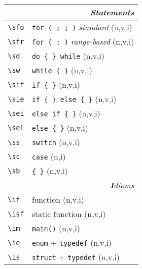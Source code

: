 \documentclass[oneside,11pt,landscape,DIV16]{scrartcl}
\begin{document}
\begin{multicols}{3}
\begin{center}
%
%
\begin{tabular}[]{|p{11mm}|p{60mm}|}
\hline
\multicolumn{2}{|r|}{\textsl{\textbf{S}tatements}} \\
\hline \verb'\sfo' & \verb'for ( ; ; )'         \hfill \textit{standard} (n,v,i)\\
\hline \verb'\sfr' & \verb'for ( : )'           \hfill \textit{range-based} (n,v,i)\\
\hline \verb'\sd'  & \verb'do { } while'        \hfill (n,v,i)\\
\hline \verb'\sw'  & \verb'while { }'           \hfill (n,v,i)\\
\hline \verb'\sif' & \verb'if { }'              \hfill (n,v,i)\\
\hline \verb'\sie' & \verb'if { } else { }'     \hfill (n,v,i)\\
\hline \verb'\sei' & \verb'else if { }'         \hfill (n,v,i)\\
\hline \verb'\sel' & \verb'else { }'            \hfill (n,v,i)\\
\hline \verb'\ss'  & \verb'switch'              \hfill (n,v,i)\\
\hline \verb'\sc'  & \verb'case'                \hfill (n,i)\\
\hline \verb'\sb'  & \verb'{ }'                 \hfill (n,v,i)\\
\hline
\hline
\multicolumn{2}{|r|}{\textsl{\textbf{I}dioms}}   \\
\hline \verb'\if'  & function                           \hfill (n,v,i)\\
\hline \verb'\isf' & static function                    \hfill (n,v,i)\\
\hline \verb'\im'  & \verb'main()'                      \hfill (n,v,i)\\
\hline \verb'\ie'  & \verb'enum'   + \verb'typedef'     \hfill (n,v,i)\\
\hline \verb'\is'  & \verb'struct' + \verb'typedef'     \hfill (n,v,i)\\

\end{tabular}
\end{center}
\end{multicols}
\end{document}
